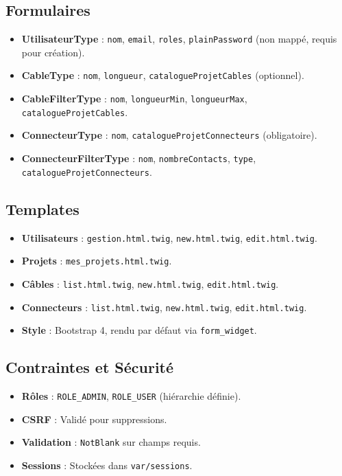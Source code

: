 \documentclass[a4paper,12pt]{article}
\begin{document}
\subsection{Formulaires}
\begin{itemize}
    \item \textbf{UtilisateurType} : \texttt{nom}, \texttt{email}, \texttt{roles}, \texttt{plainPassword} (non mappé, requis pour création).
    \item \textbf{CableType} : \texttt{nom}, \texttt{longueur}, \texttt{catalogueProjetCables} (optionnel).
    \item \textbf{CableFilterType} : \texttt{nom}, \texttt{longueurMin}, \texttt{longueurMax}, \texttt{catalogueProjetCables}.
    \item \textbf{ConnecteurType} : \texttt{nom}, \texttt{catalogueProjetConnecteurs} (obligatoire).
    \item \textbf{ConnecteurFilterType} : \texttt{nom}, \texttt{nombreContacts}, \texttt{type}, \texttt{catalogueProjetConnecteurs}.
\end{itemize}

\subsection{Templates}
\begin{itemize}
    \item \textbf{Utilisateurs} : \texttt{gestion.html.twig}, \texttt{new.html.twig}, \texttt{edit.html.twig}.
    \item \textbf{Projets} : \texttt{mes\_projets.html.twig}.
    \item \textbf{Câbles} : \texttt{list.html.twig}, \texttt{new.html.twig}, \texttt{edit.html.twig}.
    \item \textbf{Connecteurs} : \texttt{list.html.twig}, \texttt{new.html.twig}, \texttt{edit.html.twig}.
    \item \textbf{Style} : Bootstrap 4, rendu par défaut via \texttt{form\_widget}.
\end{itemize}

\subsection{Contraintes et Sécurité}
\begin{itemize}
    \item \textbf{Rôles} : \texttt{ROLE\_ADMIN}, \texttt{ROLE\_USER} (hiérarchie définie).
    \item \textbf{CSRF} : Validé pour suppressions.
    \item \textbf{Validation} : \texttt{NotBlank} sur champs requis.
    \item \textbf{Sessions} : Stockées dans \texttt{var/sessions}.
\end{itemize}
\end{document}
